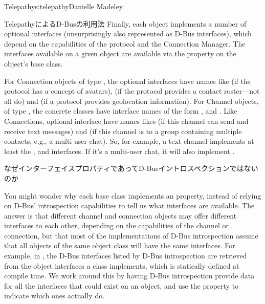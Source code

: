 \begin{aosachapter}{Telepathy}{s:telepathy}{Danielle Madeley}
\begin{aosasect1}{TelepathyによるD-Busの利用法}
Finally, each object implements a number of optional interfaces
(unsurprisingly also represented as D-Bus interfaces), which depend on
the capabilities of the protocol and the Connection Manager.  The
interfaces available on a given object are available via the
 property on the object's base class.

For Connection objects of type , the optional
interfaces have names like 
(if the protocol has a concept of avatars),
 (if the protocol provides
a contact roster---not all do) and
 (if a protocol provides
geolocation information).  For Channel objects, of type
, the concrete classes have interface names of the
form ,  and
. Like Connections, optional
interface have names likes  (if
this channel can send and receive text messages) and
 (if this channel is to a group
containing multiple contacts, e.g., a multi-user chat).  So, for
example, a text channel implements at least the ,
 and 
interfaces.  If it's a multi-user chat, it will also implement
.

\begin{aosabox}{なぜインターフェイスプロパティであってD-Busイントロスペクションではないのか}

You might wonder why each base class implements an 
property, instead of relying on D-Bus' introspection capabilities to
tell us what interfaces are available.  The answer is that different
channel and connection objects may offer different interfaces to each
other, depending on the capabilities of the channel or connection, but
that most of the implementations of D-Bus introspection assume that
all objects of the same object class will have the same interfaces.
For example, in , the D-Bus interfaces listed by
D-Bus introspection are retrieved from the object interfaces a class
implements, which is statically defined at compile time.  We work
around this by having D-Bus introspection provide data for all the
interfaces that could exist on an object, and use the
 property to indicate which ones actually do.


\end{aosabox}
\end{aosasect1}
\end{aosachapter}
